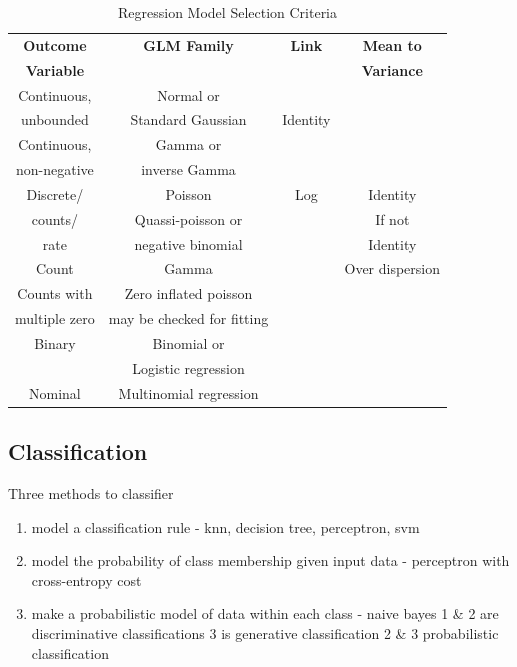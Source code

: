 \documentclass{beamer}
\begin{document}
\begin{frame}[plain]%
\begin{table}[h]
	\centering
	\begin{tabular}{cccc}
	\textbf{Outcome} & \textbf{GLM Family} & \textbf{Link} & \textbf{Mean to} \\
	\textbf{Variable} & & & \textbf{Variance} \\ 
	\hline %
	Continuous, & Normal or & \\ unbounded & Standard Gaussian & Identity &  \\  
	\hline
	Continuous, & Gamma or & \\ non-negative & inverse Gamma &  &  \\ \hline
	
	
	Discrete/ & Poisson & Log & Identity \\
	counts/ & Quassi-poisson or &  & If not \\
	rate & negative binomial & & Identity \\
	
	
	\hline
	
	Count & Gamma &  & Over dispersion \\ \hline
	Counts with & Zero inflated poisson & \\ multiple zero & may be checked 
	for fitting & & \\ \hline
	Binary & Binomial or & \\  & Logistic regression & & \\ \hline
	Nominal  & Multinomial regression & \\
	\hline
	\end{tabular} 
\caption{Regression Model Selection Criteria}
\end{table}
\end{frame}



\subsection{Classification}
\begin{frame}
	Three methods to classifier
	\begin{enumerate}
		\item model a classification rule - knn, decision tree, perceptron, svm
		\item model the probability of class membership given input data - perceptron with cross-entropy cost
		\item make a probabilistic model of data within each class - naive bayes
		1 \& 2 are discriminative classifications
		3 is generative classification
		2 \& 3 probabilistic classification
	\end{enumerate}
\end{frame}
\end{document}
